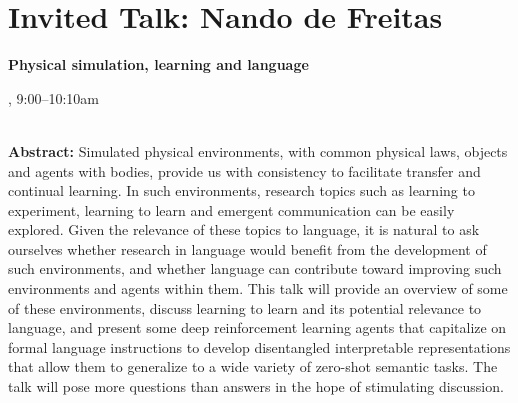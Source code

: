 \section{Invited Talk: Nando de Freitas}

\begin{center}
\begin{Large}
{\bfseries\Large Physical simulation, learning and language}
\vspace{1em}\par
\end{Large}

\daydateyear, 9:00--10:10am \vspace{1em}\\
\PlenaryLoc \\
\vspace{1em}\par
\end{center}

\noindent
{\bfseries Abstract:} Simulated physical environments, with common physical laws, objects and agents with bodies, provide us with consistency to facilitate transfer and continual learning. In such environments, research topics such as learning to experiment, learning to learn and emergent communication can be easily explored. Given the relevance of these topics to language, it is natural to ask ourselves whether research in language would benefit from the development of such environments, and whether language can contribute toward improving such environments and agents within them. This talk will provide an overview of some of these environments, discuss learning to learn and its potential relevance to language, and present some deep reinforcement learning agents that capitalize on formal language instructions to develop disentangled interpretable representations that allow them to generalize to a wide variety of zero-shot semantic tasks. The talk will pose more questions than answers in the hope of stimulating discussion. 

\vspace{3em}\par 

\vfill
\noindent

